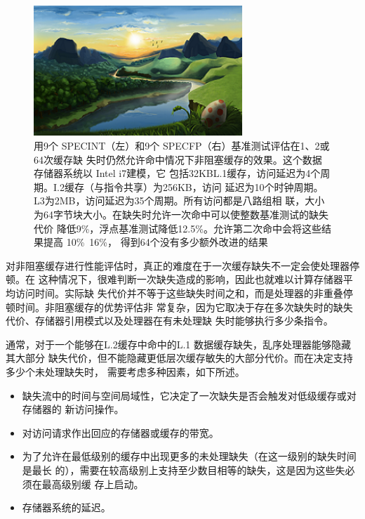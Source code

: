 \begin{figure}[!htb]
    \centering
	\includegraphics[width=0.7\textwidth]{imgs/sam.png}
	\caption{用9个 SPECINT（左）和9个 SPECFP（右）基准测试评估在1、2或64次缓存缺
            失时仍然允许命中情况下非阻塞缓存的效果。这个数据存储器系统以 Intel i7建模，它
            包括32KBL.1缓存，访问延迟为4个周期。I.2缓存（与指令共享）为256KB，访问
            延迟为10个时钟周期。L3为2MB，访问延迟为35个周期。所有访问都是八路组相
            联，大小为64字节块大小。在缺失时允许一次命中可以使整数基准测试的缺失代价
            降低9\%，浮点基准测试降低12.5\%。允许第二次命中会将这些结果提高 10\%~16\%，
            得到64个没有多少额外改进的结果}
\end{figure}

对非阻塞缓存进行性能评估时，真正的难度在于一次缓存缺失不一定会使处理器停顿。在
这种情况下，很难判断一次缺失造成的影响，因此也就难以计算存储器平均访问时间。实际缺
失代价并不等于这些缺失时间之和，而是处理器的非重叠停顿时间。非阻塞缓存的优势评估非
常复杂，因为它取决于存在多次缺失时的缺失代价、存储器引用模式以及处理器在有未处理缺
失时能够执行多少条指令。

通常，对于一个能够在L.2缓存中命中的L.1 数据缓存缺失，乱序处理器能够隐藏其大部分
缺失代价，但不能隐藏更低层次缓存敏失的大部分代价。而在决定支持多少个未处理缺失时，
需要考虑多种因素，如下所述。

\begin{itemize}
    \item 缺失流中的时间与空间局域性，它决定了一次缺失是否会触发对低级缓存或对存储器的
    新访问操作。
    \item 对访问请求作出回应的存储器或缓存的带宽。
    \item 为了允许在最低级别的缓存中出现更多的未处理缺失（在这一级别的缺失时间是最长
    的），需要在较高级别上支持至少数目相等的缺失，这是因为这些失必须在最高级别缓
    存上启动。
    \item 存储器系统的延迟。
\end{itemize}

